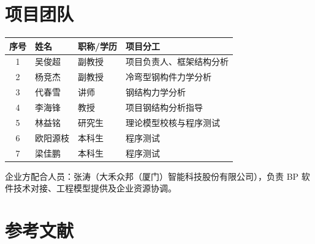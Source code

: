\documentclass{hqu-proposal}
\begin{document}
\section{项目团队}

\begin{center}
    \begin{tabular}{cllp{5cm}}
        \toprule
        \textbf{序号} & \textbf{姓名} & \textbf{职称/学历} & \textbf{项目分工} \\
        \midrule
        1 & 吴俊超 & 副教授 & 项目负责人、框架结构分析 \\
        2 & 杨竞杰 & 副教授 & 冷弯型钢构件力学分析 \\
        3 & 代春雪 & 讲师 & 钢结构力学分析 \\
        4 & 李海锋 & 教授 & 项目钢结构分析指导 \\
        5 & 林益铭 & 研究生 & 理论模型校核与程序测试\\
        6 & 欧阳源枝 & 本科生 & 程序测试 \\
        7 & 梁佳鹏 & 本科生 & 程序测试 \\
        \bottomrule
    \end{tabular}
\end{center}

\begin{flushleft}
    \small
    \hspace*{2em}企业方配合人员：张涛（大禾众邦（厦门）智能科技股份有限公司），负责 BP 软件技术对接、工程模型提供及企业资源协调。
\end{flushleft}

\renewcommand{\refname}{} 
\section{参考文献}        

        
\end{document}
